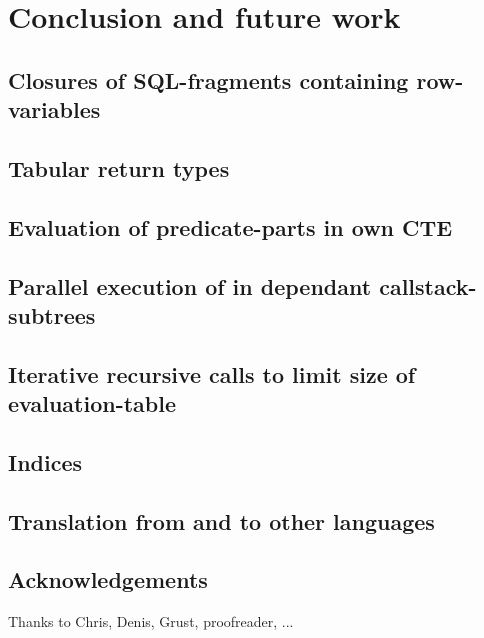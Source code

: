 \chapter{Conclusion and future work} \label{conclusion}
\section{Closures of SQL-fragments containing row-variables}
\section{Tabular return types}
\section{Evaluation of predicate-parts in own CTE}
\section{Parallel execution of in dependant callstack-subtrees}
\section{Iterative recursive calls to limit size of evaluation-table}
\section{Indices}
\section{Translation from and to other languages}
\section*{Acknowledgements}
Thanks to Chris, Denis, Grust, proofreader, ...